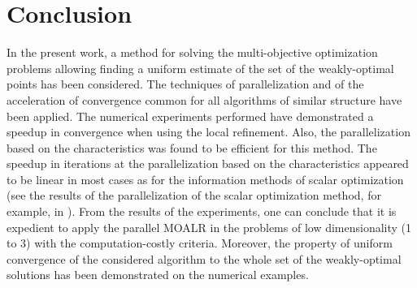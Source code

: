 \documentclass{llncs}
\begin{document}
\section{Conclusion}
In the present work, a method for solving the multi-objective optimization problems allowing
finding a uniform estimate of the set of the weakly-optimal points has been considered. The
techniques of parallelization and of the acceleration of convergence common for all algorithms
of similar structure have been applied. The numerical experiments performed have
demonstrated a speedup in convergence when using the local refinement. Also, the
parallelization based on the characteristics was found to be efficient for this method. The
speedup in iterations at the parallelization based on the characteristics appeared to be linear in
most cases as for the information methods of scalar optimization (see the results of the
parallelization of the scalar optimization method, for example, in
\cite{barkalovLebedef2016}). From the results of the experiments, one can conclude that it is
expedient to apply the parallel MOALR in the problems of low dimensionality (1 to 3) with
the computation-costly criteria. Moreover, the property of uniform convergence of the considered
algorithm to the whole set of the weakly-optimal solutions has been demonstrated on the
numerical examples.
%
%
%
%

%


\clearpage
{} %
\renewcommand{\indexname}{Author Index}
\printindex
\clearpage
\end{document}
